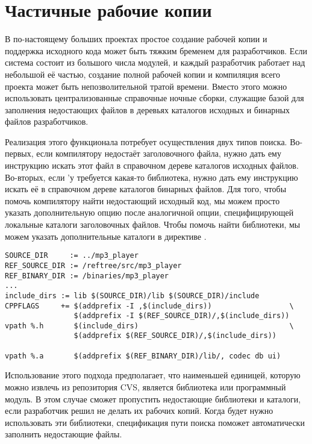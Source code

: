 \section{Частичные рабочие копии}

В по-настоящему больших проектах простое создание рабочей копии и
поддержка исходного кода может быть тяжким бременем для разработчиков.
Если система состоит из большого числа модулей, и каждый разработчик
работает над небольшой её частью, создание полной рабочей копии и
компиляция всего проекта может быть непозволительной тратой времени.
Вместо этого можно использовать централизованные справочные
ночные сборки, служащие базой для заполнения недостающих файлов в
деревьях каталогов исходных и бинарных файлов разработчиков.

Реализация этого функционала потребует осуществления двух типов
поиска. Во-первых, если компилятору недостаёт заголовочного файла,
нужно дать ему инструкцию искать этот файл в справочном дереве
каталогов исходных файлов. Во-вторых, если \Makefile{}'у требуется
какая-то библиотека, нужно дать ему инструкцию искать её в справочном
дереве каталогов бинарных файлов. Для того, чтобы помочь компилятору
найти недостающий исходный код, мы можем просто указать дополнительную
опцию  после аналогичной опции, специфицирующей локальные
каталоги заголовочных файлов. Чтобы помочь \GNUmake{} найти
библиотеки, мы можем указать дополнительные каталоги в директиве
.

{\footnotesize
\begin{verbatim}
SOURCE_DIR     := ../mp3_player
REF_SOURCE_DIR := /reftree/src/mp3_player
REF_BINARY_DIR := /binaries/mp3_player
...
include_dirs := lib $(SOURCE_DIR)/lib $(SOURCE_DIR)/include
CPPFLAGS     += $(addprefix -I ,$(include_dirs))                  \
                $(addprefix -I $(REF_SOURCE_DIR)/,$(include_dirs))
vpath %.h       $(include_dirs)                                   \
                $(addprefix $(REF_SOURCE_DIR)/,$(include_dirs))

vpath %.a       $(addprefix $(REF_BINARY_DIR)/lib/, codec db ui)
\end{verbatim}
}

Использование этого подхода предполагает, что наименьшей единицей,
которую можно извлечь из репозитория CVS, является библиотека или
программный модуль. В этом случае \GNUmake{} сможет пропустить
недостающие библиотеки и каталоги, если разработчик решил не делать их
рабочих копий. Когда будет нужно использовать эти библиотеки,
спецификация пути поиска поможет автоматически заполнить недостающие
файлы.

